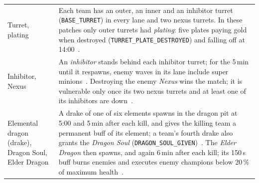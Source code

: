 \begin{table}[!t]
\begin{tabularx}{\textwidth}{@{}>{\raggedright\arraybackslash}p{2.35cm}X@{}}
Turret, plating &
  Each team has an outer, an inner and an inhibitor turret (\texttt{BASE\_TURRET}) in every lane and two
  nexus turrets. In these patches only outer turrets had \emph{plating}: five plates paying gold when
  destroyed (\texttt{TURRET\_PLATE\_DESTROYED}) and falling off at
  14:00~\cite{lolwiki2026turret,riot2026patch261}. \\
Inhibitor, Nexus &
  An \emph{inhibitor} stands behind each inhibitor turret; for the 5\,min until it respawns, enemy waves
  in its lane include super minions~\cite{lolwiki2026inhibitor}. Destroying the enemy \emph{Nexus} wins
  the match; it is vulnerable only once its two nexus turrets and at least one of its inhibitors are
  down~\cite{lolwiki2026nexus}. \\
\midrule
Elemental dragon (drake), Dragon Soul, Elder Dragon &
  A drake of one of six elements spawns in the dragon pit at 5:00 and 5\,min after each kill, and gives
  the killing team a permanent buff of its element; a team's fourth drake also grants the \emph{Dragon Soul}
  (\texttt{DRAGON\_SOUL\_GIVEN})~\cite{lolwiki2026dragonpit,lolwiki2026dragonslayer}. The \emph{Elder
  Dragon} then spawns, and again 6\,min after each kill; its 150\,s buff burns enemies and executes enemy champions below 20\,\% of
  maximum health~\cite{lolwiki2026elderdragon,lolwiki2026dragonslayer}. \\

\end{tabularx}
\end{table}
